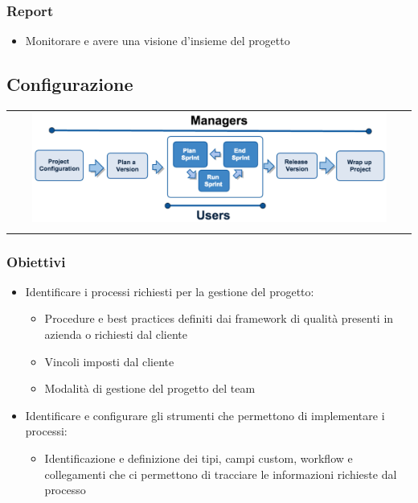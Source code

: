 \subsubsection{Report}
\begin{itemize}
    \item Monitorare e avere una visione d'insieme del progetto
\end{itemize}

\subsection{Configurazione}
\begin{center}
    \begin{tabular}{c}
        \\ \includegraphics[width=0.9\textwidth]{images/ITS2.png} \\ \\
    \end{tabular}
\end{center}

\subsubsection{Obiettivi}
\begin{itemize}
    \item Identificare i processi richiesti per la gestione del progetto:
    \begin{itemize}
        \item Procedure e best practices definiti dai framework di qualità presenti in azienda o richiesti dal cliente
        \item Vincoli imposti dal cliente
        \item Modalità di gestione del progetto del team
    \end{itemize}
    \item Identificare e configurare gli strumenti che permettono di implementare i processi:
    \begin{itemize}
        \item Identificazione e definizione dei tipi, campi custom, workflow e collegamenti che ci permettono di tracciare le informazioni richieste dal processo
    \end{itemize}
\end{itemize}

